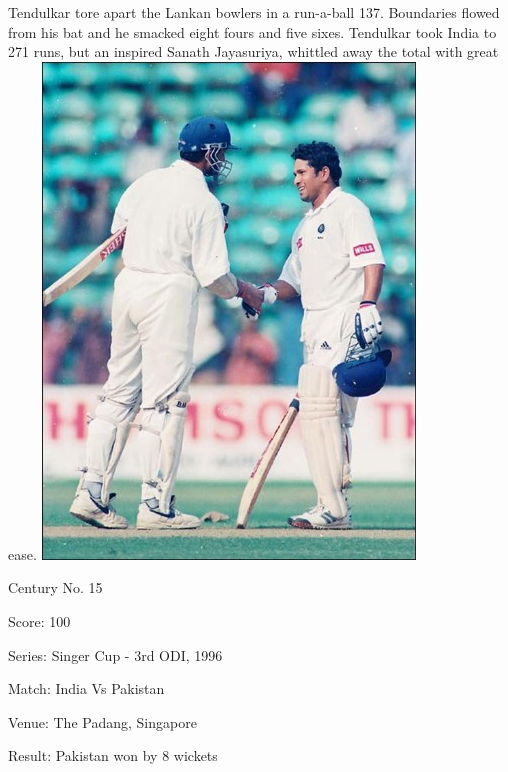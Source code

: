 \documentclass[11pt, a4paper]{article}
\begin{document}
Tendulkar tore apart the Lankan bowlers in a run-a-ball 137. Boundaries flowed from his bat and he smacked eight fours and five sixes. Tendulkar took India to 271 runs, but an inspired Sanath Jayasuriya, whittled away the total with great ease.
\newpage
\includegraphics[height=0.8\textheight]{pics/15.jpg}

Century No. 15 

Score: 100 

Series: Singer Cup - 3rd ODI, 1996 

Match: India Vs Pakistan 

Venue: The Padang, Singapore 

Result: Pakistan won by 8 wickets 
\end{document}
